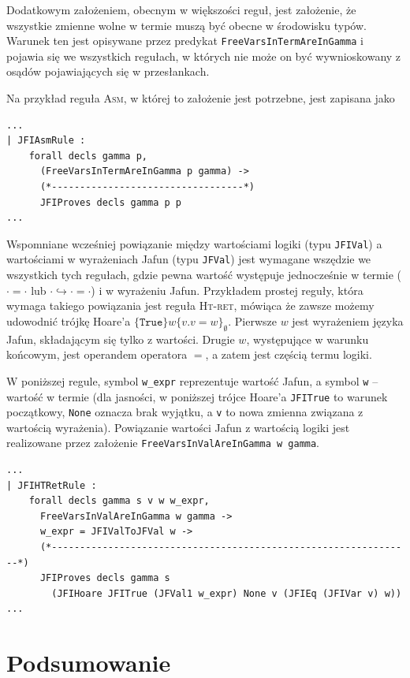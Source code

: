 \documentclass[]{pracamgr}
\newcommand \hoare [5] {\{#1\}#2\{#4.#5\}_#3}
\renewcommand \| {\hspace{0.75em} | \hspace{0.75em} }
\renewcommand \[ {[\![}
\renewcommand \] {]\!]}
\theoremstyle{definition}
\begin{document}
Dodatkowym założeniem, obecnym w większości reguł, jest założenie, że
wszystkie zmienne wolne w termie muszą być obecne w środowisku typów.
Warunek ten jest opisywane przez predykat \texttt{FreeVarsInTermAreInGamma} i pojawia się
we wszystkich regułach, w których nie może on być wywnioskowany z osądów pojawiających się
w przesłankach.

Na przykład reguła \textsc{Asm}, w której to założenie jest potrzebne, jest zapisana jako
\begin{verbatim}
...
| JFIAsmRule :
    forall decls gamma p,
      (FreeVarsInTermAreInGamma p gamma) ->
      (*----------------------------------*)
      JFIProves decls gamma p p 
...
\end{verbatim}


Wspomniane wcześniej powiązanie między wartościami logiki (typu \texttt{JFIVal}) a wartościami
w wyrażeniach Jafun (typu \texttt{JFVal}) jest wymagane wszędzie we wszystkich tych regułach,
gdzie pewna wartość występuje jednocześnie w termie
($\cdot = \cdot$ lub $\cdot \hookrightarrow \cdot = \cdot$) i w wyrażeniu Jafun.
Przykładem prostej reguły, która wymaga takiego powiązania jest reguła \textsc{Ht-ret},
mówiąca że zawsze możemy udowodnić trójkę Hoare'a
$\hoare{\mathtt{True}}{w}{\emptyset}{v}{v = w}$.
Pierwsze $w$ jest wyrażeniem języka Jafun, składającym się tylko z wartości.
Drugie $w$, występujące w warunku końcowym, jest operandem operatora $=$, a zatem jest
częścią termu logiki.

W poniższej regule, symbol \texttt{w\_expr} reprezentuje wartość Jafun, a
symbol \texttt{w} -- wartość w termie
(dla jasności, w poniższej trójce Hoare'a \texttt{JFITrue} to warunek początkowy,
\texttt{None} oznacza brak wyjątku, a \texttt{v}
to nowa zmienna związana z wartością wyrażenia).
Powiązanie wartości Jafun z wartością logiki jest realizowane przez założenie
\texttt{FreeVarsInValAreInGamma w gamma}.
\begin{verbatim}
...
| JFIHTRetRule :
    forall decls gamma s v w w_expr,
      FreeVarsInValAreInGamma w gamma ->
      w_expr = JFIValToJFVal w ->
      (*----------------------------------------------------------------*)
      JFIProves decls gamma s
        (JFIHoare JFITrue (JFVal1 w_expr) None v (JFIEq (JFIVar v) w))
...
\end{verbatim}


\chapter{Podsumowanie}
\end{document}
